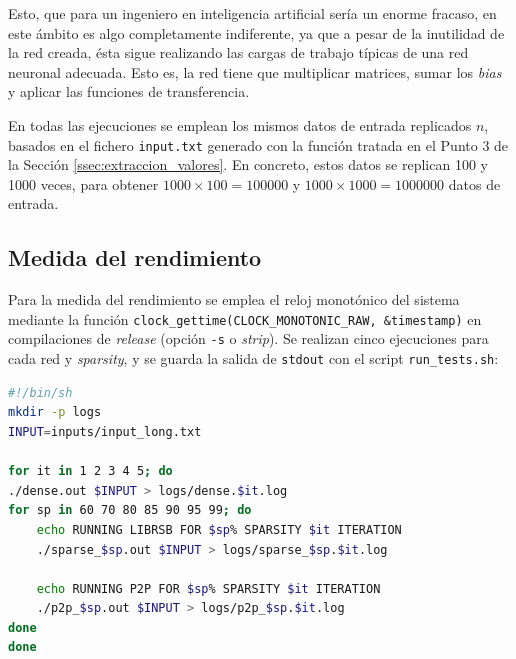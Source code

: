 Esto, que para un ingeniero en inteligencia artificial sería un enorme fracaso, en este ámbito es algo completamente indiferente, ya que a pesar de la inutilidad de la red creada, ésta sigue realizando las cargas de trabajo típicas de una red neuronal adecuada. Esto es, la red tiene que multiplicar matrices, sumar los \textit{bias} y aplicar las funciones de transferencia.

En todas las ejecuciones se emplean los mismos datos de entrada replicados $n$, basados en el fichero \texttt{input.txt} generado con la función tratada en el Punto 3 de la Sección \ref{ssec:extraccion_valores}. En concreto, estos datos se replican 100 y 1000 veces, para obtener $1000 \times 100 = 100000$ y $1000 \times 1000 = 1000000$ datos de entrada.

\subsection{Medida del rendimiento}
\label{ssec:medida_rendimiento_metodologia}
Para la medida del rendimiento se emplea el reloj monotónico del sistema mediante la función \texttt{clock\_gettime(CLOCK\_MONOTONIC\_RAW, \&timestamp)} en compilaciones de \textit{release} (opción \texttt{-s} o \textit{strip}). Se realizan cinco ejecuciones para cada red y \textit{sparsity}, y se guarda la salida de \texttt{stdout} con el script \texttt{run\_tests.sh}:\medskip
\begin{lstlisting}[language=bash]
#!/bin/sh
mkdir -p logs
INPUT=inputs/input_long.txt

for it in 1 2 3 4 5; do
./dense.out $INPUT > logs/dense.$it.log
for sp in 60 70 80 85 90 95 99; do
    echo RUNNING LIBRSB FOR $sp% SPARSITY $it ITERATION
    ./sparse_$sp.out $INPUT > logs/sparse_$sp.$it.log

    echo RUNNING P2P FOR $sp% SPARSITY $it ITERATION
    ./p2p_$sp.out $INPUT > logs/p2p_$sp.$it.log
done
done  
\end{lstlisting}

